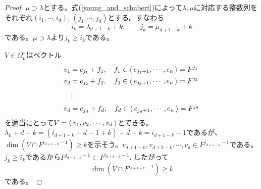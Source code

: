 \documentclass{ltjsreport}
\begin{document}
\begin{proof}
  $\mu\supset\lambda$とする。式(\ref{young_and_schubert})によって$\lambda,\mu$に対応する整数列をそれぞれ$(i_1,\cdots,i_d)$, $(j_1,\cdots,j_d)$とする。すなわち
  \[
  i_k=\lambda_{d+1-k}+k,\qquad j_k=\mu_{d+1-k}+k  
  \]
  である。$\mu\supset\lambda$より$j_k\geq i_k$である。
  
  $V\in\Omega_{\mu}^\circ$はベクトル
  \begin{align*}
    &v_1=e_{j_1}+f_1,\quad f_1\in\langle\:e_{j_1+1},\cdots,e_n\:\rangle=F^{j_1}\\
    &v_2=e_{j_2}+f_2,\quad f_2\in\langle\:e_{j_2+1},\cdots,e_n\:\rangle=F^{j_2}\\
    &\quad\vdots\\
    &v_d=e_{j_d}+f_d,\quad f_d\in\langle\:e_{j_d+1},\cdots,e_n\:\rangle=F^{j_d}
  \end{align*}
  を適当にとって$V=\langle\:v_1,v_2,\cdots,v_d\:\rangle$とできる。$\lambda_k+d-k=(i_{d+1-k}-d-1+k)+d-k=i_{d+1-k}-1$であるが、$\dim(V\cap F^{i_{d+1-k}-1})\geq k$を示そう。$v_{d+1-k},v_{d+2-k},\cdots,v_d\in F^{j_{d+1-k}-1}$である。$j_k\geq i_k$であるから$F^{j_{d+1-k}-1}\subset F^{i_{d+1-k}-1}$. したがって
  \[
  \dim(V\cap F^{i_{d+1-k}-1})\geq k
  \]
  である。


\end{proof}
\end{document}
